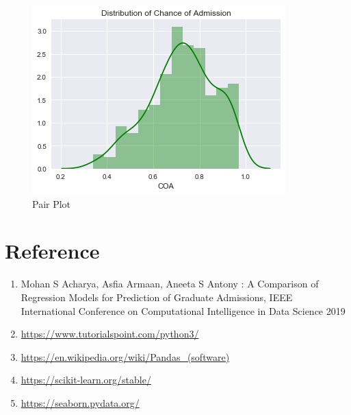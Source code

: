 \documentclass[12pt]{article}
\begin{document}
\begin{sloppypar}
\begin{figure}[H]
    \centering
    \includegraphics[scale = 1]{COA.png}
    \caption{Pair Plot}
\end{figure}

\section{Reference}

\begin{enumerate}
    \item Mohan S Acharya, Asfia Armaan, Aneeta S Antony : A Comparison of Regression Models for Prediction of Graduate Admissions, IEEE International Conference on Computational Intelligence in Data Science 2019
    \item \url{https://www.tutorialspoint.com/python3/}
    \item \url{https://en.wikipedia.org/wiki/Pandas_(software)}
    \item \url{https://scikit-learn.org/stable/}
    \item \url{https://seaborn.pydata.org/}
\end{enumerate}



\end{sloppypar}
\end{document}

